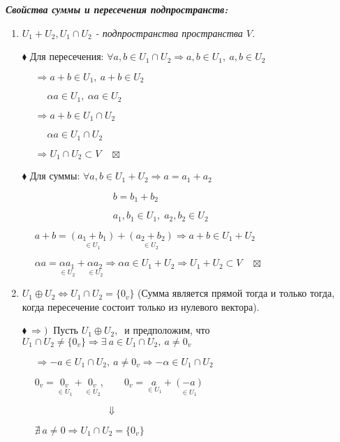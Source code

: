 \documentclass[a4paper, 12pt]{report}
\begin{document}
	\par\bigskip
	\textbf{\textit{Свойства суммы и пересечения подпространств:}}
	\begin{enumerate}
		\item \textit{$U_1 + U_2, U_1\cap U_2$  - подпространства пространства $V$.}
		
		$\blacklozenge$ Для пересечения: $\forall a,b\in U_1\cap U_2 \Rightarrow a,b \in U_1,\  a,b \in U_2$
		
		$\quad \; \Rightarrow a + b\in U_1,\  a+b\in U_2$
		
		$\quad\quad \; \; \alpha a \in U_1,\  \alpha a \in U_2$
		
		$\quad \; \Rightarrow a + b\in U_1\cap U_2$
		
		$\quad\quad \; \;\alpha a \in U_1\cap U_2$
		
		$\quad \; \Rightarrow U_1\cap U_2\subset V \quad \boxtimes$
		
		$\blacklozenge$ Для суммы: $\forall a,b\in U_1 + U_2 \Rightarrow a = a_1 + a_2$
		
		$\qquad \qquad \qquad \qquad \quad \; b = b_1 + b_2$
		
		$\qquad \qquad \qquad \qquad \quad \; a_1, b_1 \in U_1, \; a_2, b_2 \in U_2$
		
		$\quad \; a + b = \underset{\in U_1}{(a_1 + b_1)} + \underset{\in U_2}{(a_2 + b_2)} \Rightarrow a + b \in U_1 + U_2$
		
		$\quad \; \alpha a = \underset{\in U_2}{\alpha a_1} + \underset{\in U_2}{\alpha a_2} \Rightarrow \alpha a\in U_1 + U_2 \Rightarrow U_1 + U_2 \subset V \quad \boxtimes$
		
		\item $U_1 \oplus U_2 \Longleftrightarrow U_1\cap U_2 = \{0_v\}$ (Сумма является прямой тогда и только тогда, когда пересечение состоит только из нулевого вектора).
		
		$\blacklozenge\  \Rightarrow )\ $ Пусть $ U_1\oplus U_2,\ $ и предположим, что  $U_1\cap U_2 \ne \{0_v\}\Rightarrow \exists\  a\in U_1\cap U_2,\ a\ne 0_v$
		
		$\quad \; \Rightarrow -a\in U_1\cap U_2,\  a\ne 0_v \Rightarrow -\alpha \in U_1\cap U_2$
		
		$\quad \; 0_v = \underset{\in U_1}{0_v} + \underset{\in U_2}{0_v}, \qquad 0_v = \underset{\in U_1}{a} + \underset{\in U_1}{(-a)}$
		
		$\qquad\qquad\qquad\qquad\;\; \Downarrow$
		
		$\quad \; \nexists\  a \ne 0 \Rightarrow U_1\cap U_2 = \{0_v\}$
		

\end{enumerate}
\end{document}
